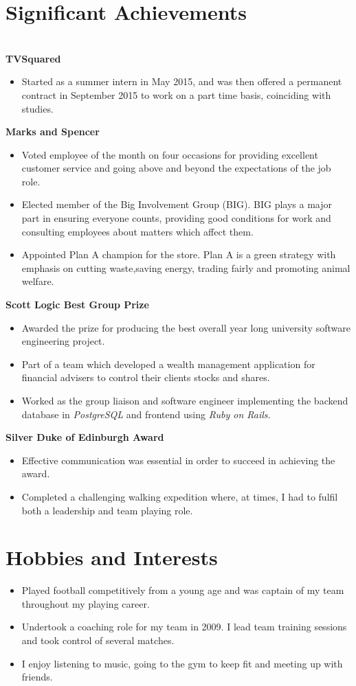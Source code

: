 \documentclass[11pt,a4paper,sans]{moderncv}
\begin{document}
\section{Significant Achievements}
\textbf{\\TVSquared}
\begin{itemize}
\item Started as a summer intern in May 2015, and was then offered a permanent contract in September 2015 to work on a part time basis, coinciding with studies.
\end{itemize}
\textbf{Marks and Spencer}
\begin{itemize}
\item Voted employee of the month on four occasions for providing excellent customer service and going above and beyond the expectations of the job role.
\item Elected member of the Big Involvement Group (BIG). BIG plays a major part in ensuring everyone counts, providing good conditions for work and consulting employees about matters which affect them.
\item Appointed Plan A champion for the store. Plan A is a green strategy with emphasis on cutting waste,saving energy, trading fairly and promoting animal welfare.
\end{itemize}
\textbf{Scott Logic Best Group Prize}
\begin{itemize}
\item Awarded the prize for producing the best overall year long university software engineering project.
\item Part of a team which developed a wealth management application for financial advisers to control their clients stocks and shares.
\item Worked as the group liaison and software engineer implementing the backend database in \textit{PostgreSQL} and frontend using \textit{Ruby on Rails.}
\end{itemize}
\textbf{Silver Duke of Edinburgh Award}
\begin{itemize}
\item Effective communication was essential in order to succeed in achieving the award.
\item Completed a challenging walking expedition where, at times, I had to fulfil both a leadership and team playing role.
\end{itemize}
\section{Hobbies and Interests}
\begin{itemize}
\item Played football competitively from a young age and was captain of my team throughout my playing career.
\item Undertook a coaching role for my team in 2009. I lead team training sessions and took control of several matches.
\item  I enjoy listening to music, going to the gym to keep fit and meeting up with friends.
\end{itemize}
\end{document}
